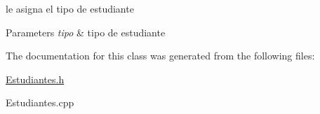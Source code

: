 le asigna el tipo de estudiante 


\begin{DoxyParams}{Parameters}
{\em tipo} & tipo de estudiante \\
\hline
\end{DoxyParams}


The documentation for this class was generated from the following files\+:\begin{DoxyCompactItemize}
\item 
\hyperlink{Estudiantes_8h}{Estudiantes.\+h}\item 
Estudiantes.\+cpp\end{DoxyCompactItemize}
